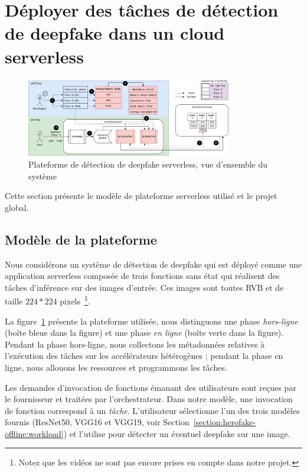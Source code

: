\section{Déployer des tâches de détection de deepfake dans un cloud serverless}
\label{section:herofake-deepfake}

\begin{figure}[t]
\centering
\includegraphics[width=0.8\textwidth]{5_Chapitre3/figures/placement.png}
\caption{Plateforme de détection de deepfake serverless, vue d'ensemble du système}
\label{figure:herofake-placement}
\end{figure}

Cette section présente le modèle de plateforme serverless utilisé et le projet global.

\subsection{Modèle de la plateforme}

Nous considérons un système de détection de deepfake qui est déployé comme une application serverless composée de trois fonctions sans état qui réalisent des tâches d'inférence sur des images d'entrée. Ces images sont toutes RVB et de taille $224 * 224$ pixels~\footnote{Notez que les vidéos ne sont pas encore prises en compte dans notre projet.}.

La figure~\ref{figure:herofake-placement} présente la plateforme utilisée, nous distinguons une phase \textit{hors-ligne} (boîte bleue dans la figure) et une phase \textit{en ligne} (boîte verte dans la figure). Pendant la phase hors-ligne, nous collectons les métadonnées relatives à l'exécution des tâches sur les accélérateurs hétérogènes ; pendant la phase en ligne, nous allouons les ressources et programmons les tâches.

Les demandes d'invocation de fonctions émanant des utilisateurs sont reçues par le fournisseur et traitées par l'orchestrateur. Dans notre modèle, une invocation de fonction correspond à un \textit{tâche}. L'utilisateur sélectionne l'un des trois modèles fournis (ResNet50, VGG16 et VGG19, voir Section~\ref{section:herofake-offline:workload}) et l'utilise pour détecter un éventuel deepfake sur une image.

